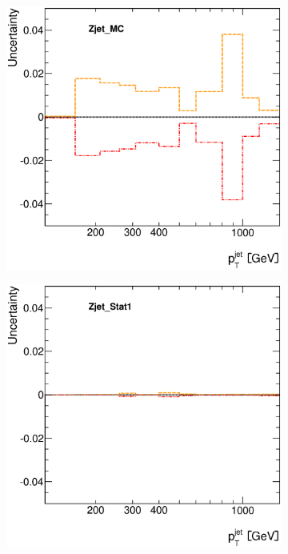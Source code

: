 \documentclass[12pt, twoside]{article}
\numberwithin{equation}{section}
\numberwithin{figure}{section}
\newenvironment{changemargin}[2]{%
\begin{list}{}{%
\setlength{\topsep}{0pt}%
\setlength{\leftmargin}{#1}%
\setlength{\rightmargin}{#2}%
\setlength{\listparindent}{\parindent}%
\setlength{\itemindent}{\parindent}%
\setlength{\parsep}{\parskip}%
}%
\item[]}{\end{list}}
\begin{document}
\begin{figure}[H]
\begin{changemargin}{-1.0cm}{-0.75cm}
\begin{changemargin}{-0.75cm}{-1.0cm}
\begin{subfigure}[b]{0.25\textwidth}
        \end{subfigure}
        \begin{subfigure}[b]{0.25\textwidth}
            \includegraphics[width=\textwidth]{./images/JetSystematics/JetSystematic-47.eps}
        \end{subfigure}
        \begin{subfigure}[b]{0.25\textwidth}
            \includegraphics[width=\textwidth]{./images/JetSystematics/JetSystematic-48.eps}
        \end{subfigure}


\end{changemargin}
\end{changemargin}
\end{figure}
\end{document}
